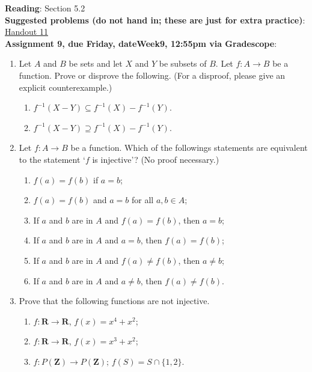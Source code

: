 \documentclass[12pt]{article}
\newcommand{\HWdueTime}{12:55pm }
\begin{document}
\noindent \textbf{Reading}: Section 5.2
\\

\noindent \textbf{Suggested problems (do not hand in; these are just for extra practice)}:
\href{https://www.math.emory.edu/~dzb/teaching/250Spring2021/handouts/250-H11-injectivity.pdf}{Handout 11}
\\


\noindent \textbf{Assignment 9, due Friday, \csname dateWeek9\endcsname, \HWdueTime via Gradescope}:
\begin{enumerate}
\item Let $A$ and $B$ be sets and let $X$ and $Y$ be subsets of $B$. Let $f\colon A \to B$ be a function. Prove or disprove the following. (For a disproof, please give an explicit counterexample.)
 \begin{enumerate}
 \item $f^{-1}(X - Y) \subseteq f^{-1}(X) - f^{-1}(Y)$.
 \item $f^{-1}(X - Y) \supseteq f^{-1}(X) - f^{-1}(Y)$.
 \end{enumerate} 

\item Let $f \colon A \to B$ be a function. Which of the followings statements are equivalent to the statement `$f$ is injective'? (No proof necessary.)
 \begin{enumerate}
 \item $f(a) = f(b)$ if $a = b$;
 \item $f(a) = f(b)$ and $a = b$ for all $a,b \in A$;
 \item If $a$ and $b$ are in $A$ and $f(a) = f(b)$, then $a = b$;
 \item If $a$ and $b$ are in $A$ and $a = b$, then $f(a) = f(b)$;
 \item If $a$ and $b$ are in $A$ and $f(a) \neq f(b)$, then $a \neq b$;
 \item If $a$ and $b$ are in $A$ and $a \neq b$, then $f(a) \neq f(b)$. 
 \end{enumerate}
 
\item Prove that the following functions are not injective. 

\begin{enumerate}
 \item $f \colon \mathbf{R}\to \mathbf{R}$, $f(x) = x^4 + x^2$;
 \item $f \colon \mathbf{R}\to \mathbf{R}$, $f(x) = x^3 + x^2$;
 \item $f \colon P(\mathbf{Z}) \to P(\mathbf{Z});\, f(S) = S \cap \{1,2\}$.


\end{enumerate}
\end{enumerate}
\end{document}
